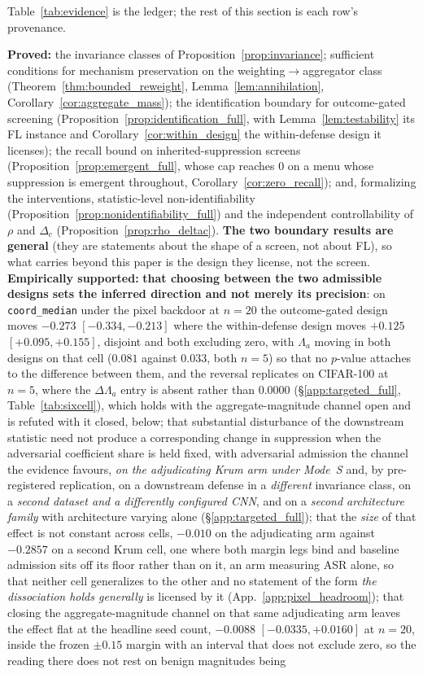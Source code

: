 \documentclass{article}
\begin{document}
\noindent Table~\ref{tab:evidence} is the ledger; the rest of this section is each row's provenance.

\textbf{Proved:} the invariance classes of Proposition~\ref{prop:invariance}; sufficient conditions for mechanism preservation on the weighting$\to$aggregator class (Theorem~\ref{thm:bounded_reweight}, Lemma~\ref{lem:annihilation}, Corollary~\ref{cor:aggregate_mass}); the identification boundary for outcome-gated screening (Proposition~\ref{prop:identification_full}, with Lemma~\ref{lem:testability} its FL instance and Corollary~\ref{cor:within_design} the within-defense design it licenses); the recall bound on inherited-suppression screens (Proposition~\ref{prop:emergent_full}, whose cap reaches $0$ on a menu whose suppression is emergent throughout, Corollary~\ref{cor:zero_recall}); and, formalizing the interventions, statistic-level non-identifiability (Proposition~\ref{prop:nonidentifiability_full}) and the independent controllability of $\rho$ and $\Delta_c$ (Proposition~\ref{prop:rho_deltac}). \textbf{The two boundary results are general} (they are statements about the shape of a screen, not about FL), so what carries beyond this paper is the design they license, not the screen. \textbf{Empirically supported:} \textbf{that choosing between the two admissible designs sets the inferred direction and not merely its precision}: on \texttt{coord\_median} under the pixel backdoor at $n{=}20$ the outcome-gated design moves $-0.273$ $[-0.334,-0.213]$ where the within-defense design moves $+0.125$ $[+0.095,+0.155]$, disjoint and both excluding zero, with $\Lambda_a$ moving in both designs on that cell ($0.081$ against $0.033$, both $n{=}5$) so that no $p$-value attaches to the difference between them, and the reversal replicates on CIFAR-100 at $n{=}5$, where the $\Delta\Lambda_a$ entry is absent rather than $0.0000$ (§\ref{app:targeted_full}, Table~\ref{tab:sixcell}), which holds with the aggregate-magnitude channel open and is refuted with it closed, below; that substantial disturbance of the downstream statistic need not produce a corresponding change in suppression when the adversarial coefficient share is held fixed, with adversarial admission the channel the evidence favours, \emph{on the adjudicating Krum arm under Mode~S} and, by pre-registered replication, on a downstream defense in a \emph{different} invariance class, on a \emph{second dataset and a differently configured CNN}, and on a \emph{second architecture family} with architecture varying alone (§\ref{app:targeted_full}); that the \emph{size} of that effect is not constant across cells, $-0.010$ on the adjudicating arm against $-0.2857$ on a second Krum cell, one where both margin legs bind and baseline admission sits off its floor rather than on it, an arm measuring ASR alone, so that neither cell generalizes to the other and no statement of the form \emph{the dissociation holds generally} is licensed by it (App.~\ref{app:pixel_headroom}); that closing the aggregate-magnitude channel on that same adjudicating arm leaves the effect flat at the headline seed count, $-0.0088$ $[-0.0335,+0.0160]$ at $n{=}20$, inside the frozen $\pm0.15$ margin with an interval that does not exclude zero, so the reading there does not rest on benign magnitudes being 
\end{document}
